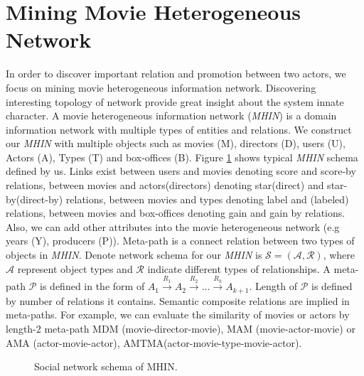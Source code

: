 \section{Mining Movie Heterogeneous Network}
\par In order to discover important relation and promotion between two actors, we focus on mining movie heterogeneous information network. Discovering interesting topology of network provide great insight about the system innate character. A movie heterogeneous information network (\emph{MHIN}) is a domain information network with multiple types of entities and relations. We construct our \emph{MHIN} with multiple objects such as movies (M), directors (D), users (U), Actors (A), Types (T) and box-offices (B). Figure \ref{fig:mhin} shows typical \emph{MHIN} schema defined by us. Links exist between users and movies denoting score and score-by relations, between movies and actors(directors) denoting star(direct) and star-by(direct-by) relations, between movies and types denoting label and (labeled) relations, between movies and box-offices denoting gain and gain by relations. Also, we can add other attributes into the movie heterogeneous network (e.g years (Y), producers (P)). Meta-path is a connect relation between two types of objects in \emph{MHIN}. Denote network schema for our \emph{MHIN} is $\mathcal{S}=(\mathcal{A}, \mathcal{R})$, where $\mathcal{A}$ represent object types and $\mathcal{R}$ indicate different types of relationships. A meta-path $\mathcal{P}$ is defined in the form of $A_1 \xrightarrow{R_1} A_2\xrightarrow{R_2} \dots\xrightarrow{R_k} A_{k+1}$. Length of $\mathcal{P}$ is defined by number of relations it contains. Semantic composite relations are implied in meta-paths. For example, we can evaluate the similarity of movies or actors by length-2 meta-path MDM (movie-director-movie), MAM (movie-actor-movie) or AMA (actor-movie-actor), AMTMA(actor-movie-type-movie-actor).

\begin{figure}[!htbp]
\centering
{}
\caption{Social network schema of MHIN.}
\label{fig:mhin}
\end{figure}

